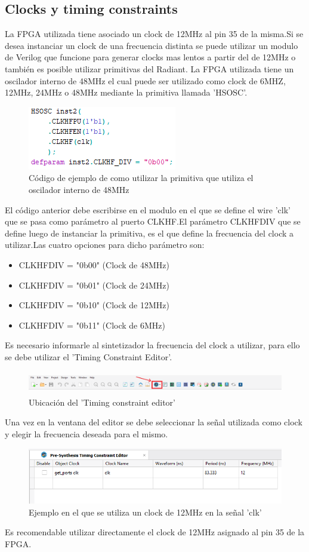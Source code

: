 \documentclass{article}
\begin{document}
\subsection{Clocks y timing constraints}
La FPGA utilizada tiene asociado un clock de 12MHz al pin 35 de la misma.Si se desea instanciar un clock de una frecuencia distinta se puede utilizar un modulo de Verilog que funcione para generar clocks mas lentos a partir del de 12MHz o también es posible utilizar primitivas del Radiant.
La FPGA utilizada tiene un oscilador interno de 48MHz el cual puede ser utilizado como clock de 6MHZ, 12MHz, 24MHz o 48MHz mediante la primitiva llamada 'HSOSC'.
	\begin{figure}[H]
	\centering
	\includegraphics[width=0.3\linewidth]{Imagenes/PrimitivaClk.png}
	\caption{Código de ejemplo de como utilizar la primitiva que utiliza el oscilador interno de 48MHz}
	\end{figure}
	El código anterior debe escribirse en el modulo en el que se define el wire 'clk' que se pasa como  parámetro al puerto CLKHF.El parámetro CLKHFDIV que se define luego de instanciar la primitiva, es el que define la frecuencia del clock a utilizar.Las cuatro opciones para dicho parámetro son:
	\begin{itemize}
	\item CLKHFDIV = "0b00" (Clock de 48MHz)
	\item CLKHFDIV = "0b01" (Clock de 24MHz)
	\item CLKHFDIV = "0b10" (Clock de 12MHz)
	\item CLKHFDIV = "0b11" (Clock de 6MHz)
	\end{itemize}
Es necesario informarle al sintetizador la frecuencia del clock a utilizar, para ello se debe utilizar el 'Timing Constraint Editor'.
	\begin{figure}[H]
	\centering
	\includegraphics[height=1cm,width=\linewidth]{Imagenes/UbicacionTiming.png}
	\caption{Ubicación del 'Timing constraint editor'}
	\end{figure}
Una vez en la ventana del editor se debe seleccionar la señal utilizada como clock y elegir la frecuencia deseada para el mismo.
	\begin{figure}[H]
	\centering
	\includegraphics[width=0.7\linewidth]{Imagenes/Clk_ejemplo.png}
	\caption{Ejemplo en el que se utiliza un clock de 12MHz en la señal 'clk'}
	\end{figure}
Es recomendable utilizar directamente el clock de 12MHz asignado al pin 35 de la FPGA.
\end{document}
